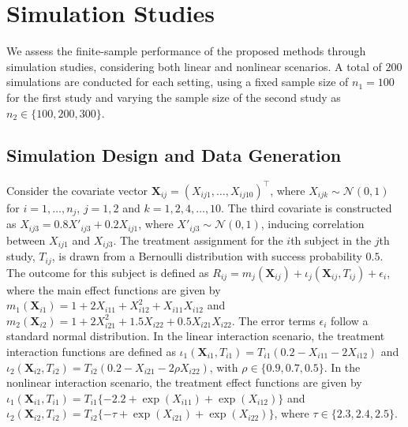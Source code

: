 \documentclass[12pt]{article}
\begin{document}
\section{Simulation Studies}\label{sec: ss}
We assess the finite-sample performance of the proposed methods through simulation studies, considering both linear and nonlinear scenarios. A total of $200$ simulations are conducted for each setting, using a fixed sample size of $n_1=100$ for the first study and varying the sample size of the second study as $n_2\in\{100, 200, 300\}$.

\subsection{Simulation Design and Data Generation}\label{subsec: sddg}
Consider the covariate vector $\boldsymbol X_{ij}=\left(X_{ij1},\ldots,X_{ij10}\right)^\top$, where $X_{ijk}\sim\mathcal N(0, 1)$ for $i=1,\ldots,n_j$, $j = 1, 2$ and $k=1,2,4,\ldots,10$. The third covariate is constructed as $X_{ij3} = 0.8X'_{ij3}+0.2X_{ij1}$, where $X'_{ij3}\sim\mathcal N(0, 1)$, inducing correlation between $X_{ij1}$ and $X_{ij3}$. The treatment assignment for the $i$th subject in the $j$th study, $T_{ij}$, is drawn from a Bernoulli distribution with success probability $0.5$. The outcome for this subject is defined as $R_{ij}=m_j(\boldsymbol X_{ij})+\iota_j(\boldsymbol X_{ij},T_{ij})+\epsilon_i$, where the main effect functions are given by $m_1(\boldsymbol X_{i1})=1+2X_{i11}+X_{i12}^2+X_{i11}X_{i12}$ and $m_2(\boldsymbol X_{i2})=1+2X_{i21}^2+1.5X_{i22}+0.5X_{i21}X_{i22}$. The error terms $\epsilon_i$ follow a standard normal distribution. In the linear interaction scenario, the treatment interaction functions are defined as $\iota_1(\boldsymbol X_{i1},T_{i1})=T_{i1}(0.2-X_{i11}-2X_{i12})$ and $\iota_2(\boldsymbol X_{i2},T_{i2})=T_{i2}(0.2-X_{i21}-2\rho X_{i22})$, with $\rho\in\{0.9,0.7,0.5\}$. In the nonlinear interaction scenario, the treatment effect functions are given by $\iota_1(\boldsymbol X_{i1},T_{i1})=T_{i1}\{-2.2+\exp(X_{i11})+\exp(X_{i12})\}$ and $\iota_2(\boldsymbol X_{i2},T_{i2})=T_{i2}\{-\tau+\exp(X_{i21})+\exp(X_{i22})\}$, where $\tau\in\{2.3,2.4,2.5\}$.
\end{document}
